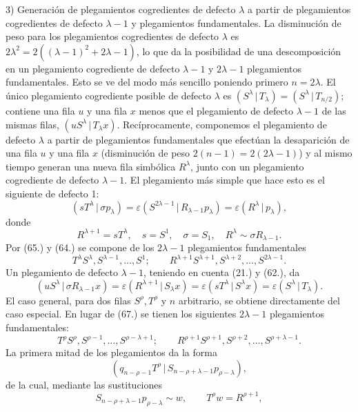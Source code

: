 \documentclass[11pt]{article}
\newcommand{\pair}[2]{(#1\,|\,#2)}
\newcommand{\eps}{\varepsilon}
\begin{document}
3) Generación de plegamientos cogredientes de defecto $\lambda$ a partir de plegamientos cogredientes de defecto $\lambda-1$ y plegamientos fundamentales. La disminución de peso para los plegamientos cogredientes de defecto $\lambda$ es $2\lambda^2=2((\lambda-1)^2+2\lambda-1)$, lo que da la posibilidad de una descomposición en un plegamiento cogrediente de defecto $\lambda-1$ y $2\lambda-1$ plegamientos fundamentales. Esto se ve del modo más sencillo poniendo primero $n=2\lambda$. El único plegamiento cogrediente posible de defecto $\lambda$ es $\pair{S^\lambda}{T_\lambda}=\pair{S^\lambda}{T_{n/2}}$; contiene una fila $u$ y una fila $x$ menos que el plegamiento de defecto $\lambda-1$ de las mismas filas, $\pair{uS^\lambda}{T_\lambda x}$. Recíprocamente, componemos el plegamiento de defecto $\lambda$ a partir de plegamientos fundamentales que efectúan la desaparición de una fila $u$ y una fila $x$ (disminución de peso $2(n-1)=2(2\lambda-1)$) y al mismo tiempo generan una nueva fila simbólica $R^\lambda$, junto con un plegamiento cogrediente de defecto $\lambda-1$. El plegamiento más simple que hace esto es el siguiente de defecto 1:
\[
 \pair{sT^\lambda}{\sigma p_\lambda}=\eps\pair{S^{2\lambda-1}}{R_{\lambda-1}p_\lambda}=\eps\pair{R^\lambda}{p_\lambda},
\]
donde
\[
 R^{\lambda+1}=sT^\lambda,
 \quad s=S^1,
 \quad \sigma=S_1,
 \quad R^\lambda\sim\sigma R_{\lambda-1}.
\]
Por (65.) y (64.) se compone de los $2\lambda-1$ plegamientos fundamentales
\begin{equation}
 T^\lambda S^\lambda,S^{\lambda-1},\ldots,S^1;
 \qquad R^{\lambda+1}S^{\lambda+1},S^{\lambda+2},\ldots,S^{2\lambda-1}.
\tag{67}
\end{equation}
Un plegamiento de defecto $\lambda-1$, teniendo en cuenta (21.) y (62.), da
\[
 \pair{uS^\lambda}{\sigma R_{\lambda-1}x}=\eps\pair{R^{\lambda+1}}{S_\lambda x}
 =\eps\pair{sT^\lambda}{S^\lambda x}=\eps\pair{S^\lambda}{T_\lambda}.
\]
El caso general, para dos filas $S^\rho,T^\rho$ y $n$ arbitrario, se obtiene directamente del caso especial. En lugar de (67.) se tienen los siguientes $2\lambda-1$ plegamientos fundamentales:
\begin{equation}
 T^\rho S^\rho,S^{\rho-1},\ldots,S^{\rho-\lambda+1};
 \qquad R^{\rho+1}S^{\rho+1},S^{\rho+2},\ldots,S^{\rho+\lambda-1}.
\tag{68}
\end{equation}
La primera mitad de los plegamientos da la forma
\[
 \pair{q_{n-\rho-1}T^\rho}{S_{n-\rho+\lambda-1}p_{\rho-\lambda}},
\]
de la cual, mediante las sustituciones
\[
 S_{n-\rho+\lambda-1}p_{\rho-\lambda}\sim w,
 \qquad T^\rho w=R^{\rho+1},
\]
\end{document}
